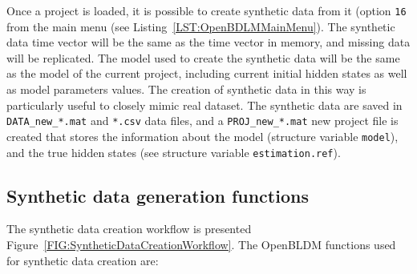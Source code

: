 Once a project is loaded, it is possible to create synthetic data from it (option \colorbox{light-gray}{\lstinline[basicstyle = \mlttfamily \small, backgroundcolor = \color{light-gray}]!16!} from the main menu (see Listing~\ref{LST:OpenBDLMMainMenu}).
The synthetic data time vector will be the same as the time vector in memory, and missing data will be replicated.
The model used to create the synthetic data will be the same as the model of the current project, including current initial hidden states as well as model parameters values.
The creation of synthetic data in this way is particularly useful to closely mimic real dataset.
The synthetic data are saved in \lstinline[basicstyle = \mlttfamily \small, backgroundcolor = \color{light-gray}]!DATA_new_*.mat! and \lstinline[basicstyle = \mlttfamily \small, backgroundcolor = \color{light-gray}]!*.csv! data files, and a \lstinline[basicstyle = \mlttfamily \small, backgroundcolor = \color{light-gray}]!PROJ_new_*.mat! new project file is created that stores the information about the model (structure variable \lstinline[basicstyle = \mlttfamily \small, backgroundcolor = \color{light-gray}]!model!), and the true hidden states (see structure variable \lstinline[basicstyle = \mlttfamily \small, backgroundcolor = \color{light-gray}]!estimation.ref!).






\subsection{Synthetic data generation functions}


The synthetic data creation workflow is presented Figure~\ref{FIG:SyntheticDataCreationWorkflow}. 
The OpenBLDM functions used for synthetic data creation are:

